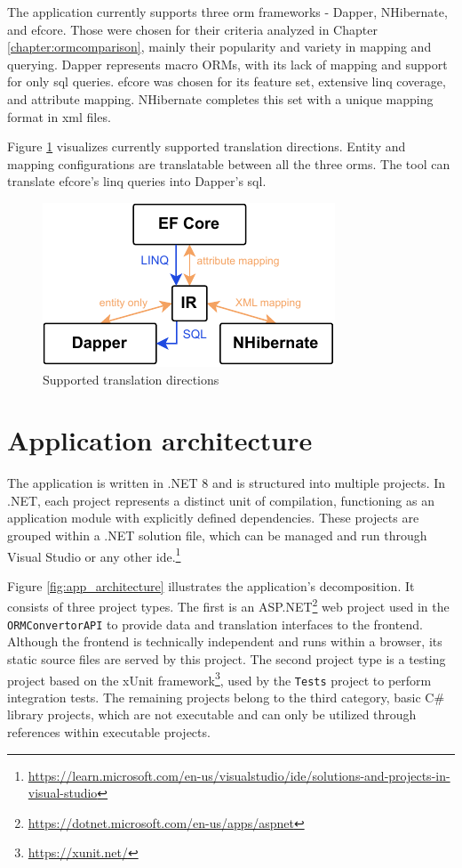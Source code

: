 The application currently supports three \acrshort{orm} frameworks - Dapper, NHibernate, and \acrshort{efcore}. Those were chosen for their criteria analyzed in Chapter \ref{chapter:ormcomparison}, mainly their popularity and variety in mapping and querying. Dapper represents macro ORMs, with its lack of mapping and support for only \acrshort{sql} queries. \acrshort{efcore} was chosen for its feature set, extensive \acrshort{linq} coverage, and attribute mapping. NHibernate completes this set with a unique mapping format in \acrshort{xml} files.

Figure \ref{fig:supported_directions} visualizes currently supported translation directions. Entity and mapping configurations are translatable between all the three \acrshort{orm}s. The tool can translate \acrshort{efcore}'s \acrshort{linq} queries into Dapper's \acrshort{sql}.

\begin{figure}[!htp]
  \centering
  \includegraphics[scale=1.5]{thesis/img/thesis/06_supported_directions.drawio.pdf}
  \caption{Supported translation directions}
  \label{fig:supported_directions}
\end{figure}

\section{Application architecture}
The application is written in .NET 8 and is structured into multiple projects. In .NET, each project represents a distinct unit of compilation, functioning as an application module with explicitly defined dependencies. These projects are grouped within a .NET solution file, which can be managed and run through Visual Studio or any other \acrshort{ide}.\footnote{\url{https://learn.microsoft.com/en-us/visualstudio/ide/solutions-and-projects-in-visual-studio}} 

Figure \ref{fig:app_architecture} illustrates the application's decomposition. It consists of three project types. The first is an ASP.NET\footnote{\url{https://dotnet.microsoft.com/en-us/apps/aspnet}} web project used in the \texttt{ORMConvertorAPI} to provide data and translation interfaces to the frontend. Although the frontend is technically independent and runs within a browser, its static source files are served by this project. 
The second project type is a testing project based on the xUnit framework\footnote{\url{https://xunit.net/}}, used by the \texttt{Tests} project to perform integration tests. The remaining projects belong to the third category, basic C\# library projects, which are not executable and can only be utilized through references within executable projects.

